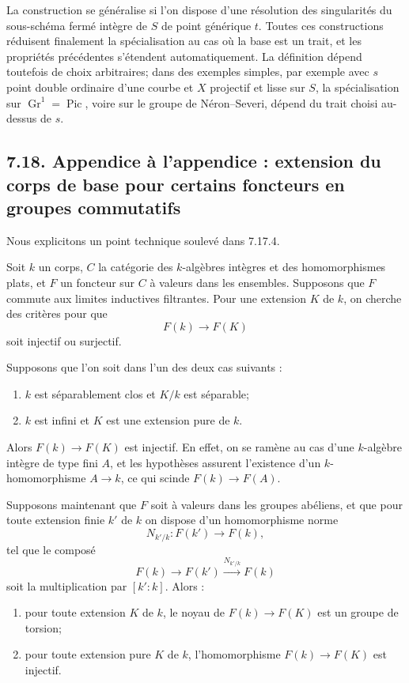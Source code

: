 \documentclass[11pt]{article}
\newcommand{\Gr}{\operatorname{Gr}}
\providecommand{\Pic}{\operatorname{Pic}}
\providecommand{\Gr}{\operatorname{Gr}}
\providecommand{\Gr}{\operatorname{G}}
\begin{document}
La construction se généralise si l'on dispose d'une résolution des singularités du sous-schéma fermé intègre de \(S\) de point générique \(t\). Toutes ces constructions réduisent finalement la spécialisation au cas où la base est un trait, et les propriétés précédentes s'étendent automatiquement. La définition dépend toutefois de choix arbitraires; dans des exemples simples, par exemple avec \(s\) point double ordinaire d'une courbe et \(X\) projectif et lisse sur \(S\), la spécialisation sur \(\Gr^1=\Pic\), voire sur le groupe de Néron--Severi, dépend du trait choisi au-dessus de \(s\).

\subsection*{7.18. Appendice à l'appendice : extension du corps de base pour certains foncteurs en groupes commutatifs}
Nous explicitons un point technique soulevé dans 7.17.4.

Soit \(k\) un corps, \(C\) la catégorie des \(k\)-algèbres intègres et des homomorphismes plats, et \(F\) un foncteur sur \(C\) à valeurs dans les ensembles. Supposons que \(F\) commute aux limites inductives filtrantes. Pour une extension \(K\) de \(k\), on cherche des critères pour que
\[
  F(k)\longrightarrow F(K)
\]
soit injectif ou surjectif.

Supposons que l'on soit dans l'un des deux cas suivants :
\begin{enumerate}[label=\alph*)]
\item \(k\) est séparablement clos et \(K/k\) est séparable;
\item \(k\) est infini et \(K\) est une extension pure de \(k\).
\end{enumerate}
Alors \(F(k)\to F(K)\) est injectif. En effet, on se ramène au cas d'une \(k\)-algèbre intègre de type fini \(A\), et les hypothèses assurent l'existence d'un \(k\)-homomorphisme \(A\to k\), ce qui scinde \(F(k)\to F(A)\).

Supposons maintenant que \(F\) soit à valeurs dans les groupes abéliens, et que pour toute extension finie \(k'\) de \(k\) on dispose d'un homomorphisme norme
\[
  N_{k'/k}:F(k')\longrightarrow F(k),
\]
tel que le composé
\[
  F(k)\longrightarrow F(k')\xrightarrow{N_{k'/k}}F(k)
\]
soit la multiplication par \([k':k]\). Alors :
\begin{enumerate}[label=(\roman*)]
\item pour toute extension \(K\) de \(k\), le noyau de \(F(k)\to F(K)\) est un groupe de torsion;
\item pour toute extension pure \(K\) de \(k\), l'homomorphisme \(F(k)\to F(K)\) est injectif.
\end{enumerate}
\end{document}
